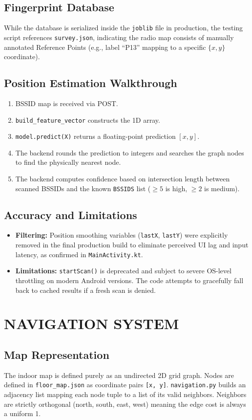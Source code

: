 \documentclass[11pt,a4paper]{article}
\begin{document}
\subsection{Fingerprint Database}
While the database is serialized inside the \texttt{joblib} file in production, the testing script references \texttt{survey.json}, indicating the radio map consists of manually annotated Reference Points (e.g., label ``P13'' mapping to a specific $\{x, y\}$ coordinate).
\subsection{Position Estimation Walkthrough}
\begin{enumerate}
\item BSSID map is received via POST.
\item \texttt{build\_feature\_vector} constructs the 1D array.
\item \texttt{model.predict(X)} returns a floating-point prediction $[x, y]$.
\item The backend rounds the prediction to integers and searches the graph nodes to find the physically nearest node.
\item The backend computes confidence based on intersection length between scanned BSSIDs and the known \texttt{BSSIDS} list ($\geq 5$ is high, $\geq 2$ is medium).
\end{enumerate}
\subsection{Accuracy and Limitations}
\begin{itemize}
\item \textbf{Filtering:} Position smoothing variables (\texttt{lastX}, \texttt{lastY}) were explicitly removed in the final production build to eliminate perceived UI lag and input latency, as confirmed in \texttt{MainActivity.kt}.
\item \textbf{Limitations:} \texttt{startScan()} is deprecated and subject to severe OS-level throttling on modern Android versions. The code attempts to gracefully fall back to cached results if a fresh scan is denied.
\end{itemize}
\section{NAVIGATION SYSTEM}
\subsection{Map Representation}
The indoor map is defined purely as an undirected 2D grid graph. Nodes are defined in \texttt{floor\_map.json} as coordinate pairs \texttt{[x, y]}. \texttt{navigation.py} builds an adjacency list mapping each node tuple to a list of its valid neighbors. Neighbors are strictly orthogonal (north, south, east, west) meaning the edge cost is always a uniform 1.
\end{document}
